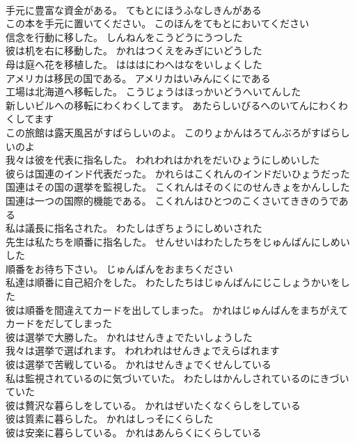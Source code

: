 \documentclass[8pt]{extreport}
\begin{document}
\begin{CJK}{UTF8}{min}
\\	手元に豊富な資金がある。	てもとにほうふなしきんがある 
\\	この本を手元に置いてください。	このほんをてもとにおいてください 
\\	信念を行動に移した。	しんねんをこうどうにうつした 
\\	彼は机を右に移動した。	かれはつくえをみぎにいどうした 
\\	母は庭へ花を移植した。	はははにわへはなをいしょくした 
\\	アメリカは移民の国である。	アメリカはいみんにくにである 
\\	工場は北海道へ移転した。	こうじょうはほっかいどうへいてんした 
\\	新しいビルへの移転にわくわくしてます。	あたらしいびるへのいてんにわくわくしてます 
\\	この旅館は露天風呂がすばらしいのよ。	このりょかんはろてんぶろがすばらしいのよ 
\\	我々は彼を代表に指名した。	われわれはかれをだいひょうにしめいした 
\\	彼らは国連のインド代表だった。	かれらはこくれんのインドだいひょうだった 
\\	国連はその国の選挙を監視した。	こくれんはそのくにのせんきょをかんしした 
\\	国連は一つの国際的機能である。	こくれんはひとつのこくさいてききのうである 
\\	私は議長に指名された。	わたしはぎちょうにしめいされた 
\\	先生は私たちを順番に指名した。	せんせいはわたしたちをじゅんばんにしめいした 
\\	順番をお待ち下さい。	じゅんばんをおまちください 
\\	私達は順番に自己紹介をした。	わたしたちはじゅんばんにじこしょうかいをした 
\\	彼は順番を間違えてカードを出してしまった。	かれはじゅんばんをまちがえてカードをだしてしまった 
\\	彼は選挙で大勝した。	かれはせんきょでたいしょうした 
\\	我々は選挙で選ばれます。	われわれはせんきょでえらばれます 
\\	彼は選挙で苦戦している。	かれはせんきょでくせんしている 
\\	私は監視されているのに気づいていた。	わたしはかんしされているのにきづいていた 
\\	彼は贅沢な暮らしをしている。	かれはぜいたくなくらしをしている 
\\	彼は質素に暮らした。	かれはしっそにくらした 
\\	彼は安楽に暮らしている。	かれはあんらくにくらしている 

\end{CJK}
\end{document}
